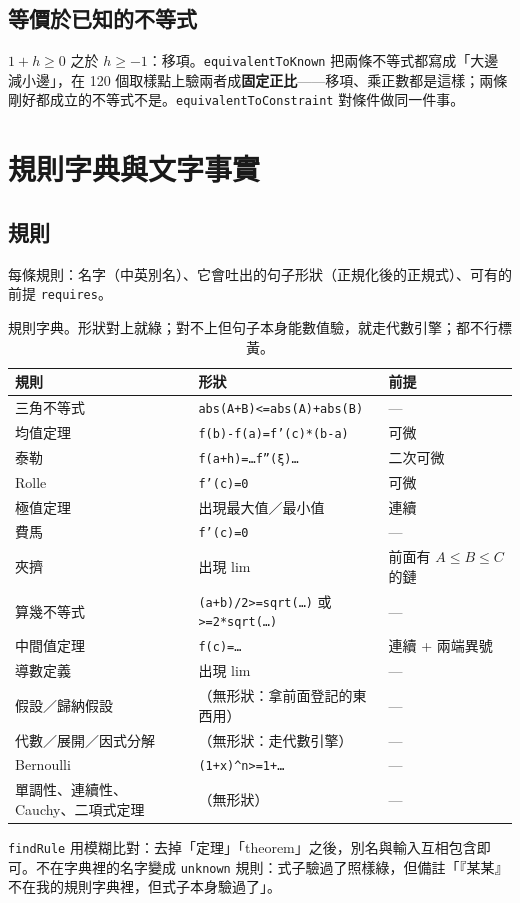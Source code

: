 \documentclass[11pt,a4paper,oneside]{book}
\renewcommand{\_}{\ifmmode\origunderscore\else\textunderscore\allowbreak\fi}
\newcommand{\code}[1]{\texttt{#1}}
\begin{document}
\section{等價於已知的不等式}
$1 + h \ge 0$ 之於 $h \ge -1$：移項。\code{equivalentToKnown} 把兩條不等式都寫成「大邊減小邊」，在 120 個取樣點上驗兩者成\textbf{固定正比}——移項、乘正數都是這樣；兩條剛好都成立的不等式不是。\code{equivalentToConstraint} 對條件做同一件事。

\chapter{規則字典與文字事實}
\section{規則}
每條規則：名字（中英別名）、它會吐出的句子形狀（正規化後的正規式）、可有的前提 \code{requires}。
\begin{table}[h]
\centering\small\sffamily
\begin{tabularx}{\textwidth}{@{}lYl@{}}
\toprule
規則 & 形狀 & 前提 \\
\midrule
三角不等式 & \code{abs(A+B)<=abs(A)+abs(B)} & — \\
均值定理 & \code{f(b)-f(a)=f'(c)*(b-a)} & 可微 \\
泰勒 & \code{f(a+h)=…f''(ξ)…} & 二次可微 \\
Rolle & \code{f'(c)=0} & 可微 \\
極值定理 & 出現最大值／最小值 & 連續 \\
費馬 & \code{f'(c)=0} & — \\
夾擠 & 出現 lim & 前面有 $A \le B \le C$ 的鏈 \\
算幾不等式 & \code{(a+b)/2>=sqrt(…)} 或 \code{>=2*sqrt(…)} & — \\
中間值定理 & \code{f(c)=…} & 連續 + 兩端異號 \\
導數定義 & 出現 lim & — \\
假設／歸納假設 & （無形狀：拿前面登記的東西用） & — \\
代數／展開／因式分解 & （無形狀：走代數引擎） & — \\
Bernoulli & \code{(1+x)\string^n>=1+…} & — \\
單調性、連續性、Cauchy、二項式定理 & （無形狀） & — \\
\bottomrule
\end{tabularx}
\caption{規則字典。形狀對上就綠；對不上但句子本身能數值驗，就走代數引擎；都不行標黃。}
\end{table}
\code{findRule} 用模糊比對：去掉「定理」「theorem」之後，別名與輸入互相包含即可。不在字典裡的名字變成 \code{unknown} 規則：式子驗過了照樣綠，但備註「『某某』不在我的規則字典裡，但式子本身驗過了」。
\end{document}
